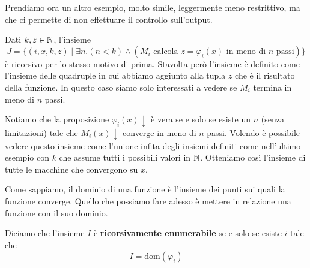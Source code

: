 Prendiamo ora un altro esempio, molto simile, leggermente meno
restrittivo, ma che ci permette di non effettuare il controllo
sull'output.

\begin{example}
	Dati $k, z \in \mathbb{N}$, l'insieme
	\[
		J = \{ (i,x,k,z) \mid \exists n . (n < k)
		\land (M_i \text{ calcola } z = \varphi_i (x)
		\text{ in meno di } n \text{ passi}) \}
	\]
	è ricorsivo per lo stesso motivo di prima. Stavolta però
	l'insieme è definito come l'insieme delle quadruple in cui
	abbiamo aggiunto alla tupla $z$ che è il risultato della
	funzione. In questo caso siamo solo interessati a vedere se
	$M_i$ termina in meno di $n$ passi.
\end{example}

Notiamo che la proposizione $\varphi_i (x) \downarrow$ è vera se
e solo se esiste un $n$ (senza limitazioni) tale che
$M_i(x) \downarrow$ converge in meno di $n$ passi. Volendo è
possibile vedere questo insieme come l'unione infita degli
insiemi definiti come nell'ultimo esempio con $k$ che assume
tutti i possibili valori in $\mathbb{N}$. Otteniamo così l'insieme di
tutte le macchine che convergono su $x$.

Come sappiamo, il dominio di una funzione è l'insieme dei punti
sui quali la funzione converge. Quello che possiamo fare adesso
è mettere in relazione una funzione con il suo dominio.

\begin{definition} \label{def: rec_enum}
	Diciamo che l'insieme $I$ è \textbf{ricorsivamente enumerabile}
	se e solo se esiste $i$ tale che
	\[ I = \text{dom}(\varphi_i) \]
\end{definition}

